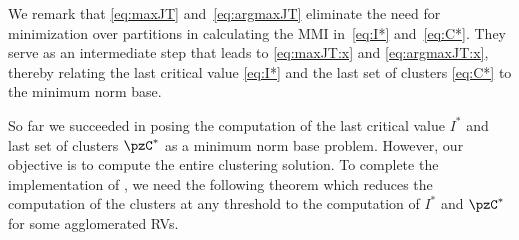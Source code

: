 We remark that \eqref{eq:maxJT} and~\eqref{eq:argmaxJT} eliminate the need for minimization over
partitions in calculating the MMI in~\eqref{eq:I*} and~\eqref{eq:C*}. They serve as an intermediate
step that leads to \eqref{eq:maxJT:x} and \eqref{eq:argmaxJT:x}, thereby relating the last critical value \eqref{eq:I*} and the last set of clusters 
\eqref{eq:C*} to the minimum norm base. 

%	
%



So far we succeeded in posing the computation of the last critical value $I^{*}$ and
last set of clusters $\pzC^{*}$ as a minimum norm base problem.
However, our objective is to compute the entire clustering solution.
To complete the implementation of \Agglomerate, we need the following theorem which reduces
the computation of the clusters at any threshold to the computation of $I^*$ and $\pzC^*$ for some
agglomerated RVs.

